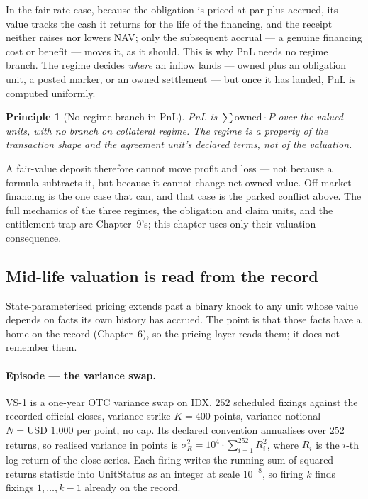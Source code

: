 \documentclass[11pt,a4paper]{article}
\newcommand{\USD}[1]{\mbox{USD~#1}}
\newtheorem{principle}[definition]{Principle}
\begin{document}
In the fair-rate case, because the obligation is priced at par-plus-accrued, its
value tracks the cash it returns for the life of the financing, and the receipt
neither raises nor lowers NAV; only the subsequent accrual --- a genuine
financing cost or
benefit --- moves it, as it should. This is why PnL needs no regime branch. The
regime decides \emph{where} an inflow lands --- owned plus an obligation unit,
a posted marker, or an owned settlement --- but once it has landed, PnL is
computed uniformly.

\begin{principle}[No regime branch in PnL]
PnL is $\sum \mathrm{owned}\cdot P$ over the valued units, with no branch on
collateral regime. The regime is a property of the transaction shape and the
agreement unit's declared terms, not of the valuation.
\end{principle}

A fair-value deposit therefore cannot move profit and loss --- not because a
formula subtracts it, but because it cannot change net owned value. Off-market
financing is the one case that can, and that case is the parked conflict above.
The full mechanics of the three regimes, the obligation and claim units, and
the entitlement trap are Chapter~9's; this chapter uses only their valuation
consequence.

\subsection{Mid-life valuation is read from the record}

State-parameterised pricing extends past a binary knock to any unit whose value
depends on facts its own history has accrued. The point is that those facts
have a home on the record (Chapter~6), so the pricing layer reads them; it does
not remember them.

\paragraph{Episode --- the variance swap.}
VS-1 is a one-year OTC variance swap on IDX, $252$ scheduled fixings against
the recorded official closes, variance strike $K = 400$ points, variance
notional $N = \USD{1,000}$ per point, no cap. Its declared convention
annualises over $252$ returns, so realised variance in points is
$\sigma^2_R = 10^4 \cdot \sum_{i=1}^{252} R_i^2$, where $R_i$ is the $i$-th log
return of the close series. Each firing writes the running
sum-of-squared-returns statistic into UnitStatus as an integer at scale
$10^{-8}$, so firing $k$ finds fixings $1,\dots,k-1$ already on the record.
\end{document}
